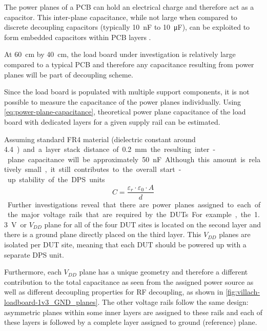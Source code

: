 The power planes of a \ac{PCB} can hold an electrical charge and therefore
act as a capacitor.
This inter-plane capacitance, while not large when compared to discrete
decoupling capacitors (typically \SI{10}{\nano\farad} to \SI{10}{\micro\farad}),
can be exploited to form embedded capacitors within
\ac{PCB} layers \autocite{7810044}.

At \SI{60}{\centi\meter} by \SI{40}{\centi\meter}, the load board under
investigation is relatively large compared to a typical
\ac{PCB} and therefore any capacitance resulting from power planes will be part
of decoupling scheme.

Since the load board is populated with multiple support components, it is not
possible to measure the capacitance of the power planes individually.
Using \autoref{eq:power-plane-capacitance}, theoretical power plane
capacitance of the load board with dedicated layers for a given supply rail
can be estimated.

Assuming standard FR4 material (dielectric constant around
\SI{4.4}) and a layer stack distance of \SI{0.2}{\milli\meter}
the resulting inter-plane capacitance will be
approximately \SI{50}{\nano\farad}.
Although this amount is relatively small, it still contributes to the overall
start-up stability of the \ac{DPS} units.

\begin{equation}
    \label{eq:power-plane-capacitance}
    C = \frac{\varepsilon_r \cdot \varepsilon_0 \cdot A}{d}
\end{equation}

Further investigations reveal that there are power planes assigned to each of
the major voltage rails that are required by the \acp{DUT}.
For example, the \SI{1.3}{\volt} or $V_{DD}$ plane for all
of the four \ac{DUT} sites is located on the second layer and there is a ground
plane directly placed on the third layer.
This $V_{DD}$ planes are isolated per \ac{DUT} site, meaning that each \ac{DUT}
should be powered up with a separate \ac{DPS} unit.

Furthermore, each $V_{DD}$ plane has a unique geometry and therefore a different
contribution to the total capacitance as seen from the assigned power source
as well as different decoupling properties for \ac{RF} decoupling,
as shown in \autoref{fig:villach-loadboard-1v3_GND_planes}.
The other voltage rails follow the same design: asymmetric planes within some
inner layers are assigned to these rails and each of these layers is followed
by a complete layer assigned to ground (reference) plane.

